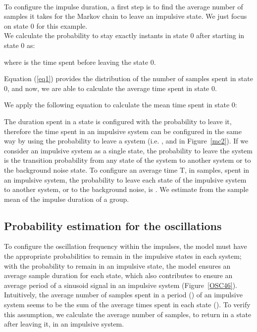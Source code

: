 \documentclass[journal]{IEEEtran}
\begin{document}
\

To configure the impulse duration, a first step is to find the average number of samples it takes for the Markov chain to leave an impulsive state. We just focus on state 0 for this example.\\
We calculate the probability to stay exactly  instants in state 0 after starting in state 0 as:
\small

\normalsize
where  is the time spent before leaving the state 0.\

Equation (\ref{eq1}) provides the distribution of the number of samples spent in state 0, and now, we are able to calculate the average time spent in state 0.\

We apply the following equation to calculate the mean time spent in state 0:
\

The duration spent in a state is configured with the probability to leave it, therefore the time spent in an impulsive system can be configured in the same way by using the probability to leave a system (i.e. ,  and  in Figure~\ref{mc2}). If we consider an impulsive system as a single state, the probability to leave the system is the transition probability from any state of the system to another system or to the background noise state. To configure an average time T, in samples, spent in an impulsive system, the probability to leave each state of the impulsive system to another system, or to the background noise, is . We estimate  from the sample mean of the impulse duration of a group.
\subsection{Probability estimation for the oscillations}
To configure the oscillation frequency within the impulses, the model must have the appropriate probabilities to remain in the impulsive states in each system; with the probability to remain in an impulsive state, the model ensures an average sample duration for each state, which also contributes to ensure an average period of a sinusoid signal in an impulsive system (Figure~\ref{OSC46}). Intuitively, the average number of samples spent in a period () of an impulsive system seems to be the sum of the average times spent in each state (). To verify this assumption, we calculate the average number of samples,  to return in a state after leaving it, in an impulsive system.\
\end{document}
